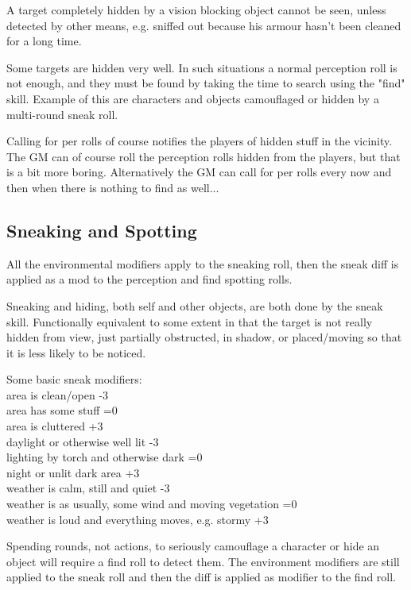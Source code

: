 A target completely hidden by a vision blocking object cannot be seen, unless detected by other means, e.g. sniffed out because his armour hasn't been cleaned for a long time.

Some targets are hidden very well. In such situations a normal perception roll is not enough, and they must be found by taking the time to search using the "find" skill. Example of this are characters and objects camouflaged or hidden by a multi-round sneak roll.

Calling for per rolls of course notifies the players of hidden stuff in the vicinity.
The GM can of course roll the perception rolls hidden from the players, but that is a bit more boring. Alternatively the GM can call for per rolls every now and then when there is nothing to find as well...


\subsection*{Sneaking and Spotting}
All the environmental modifiers apply to the sneaking roll, then the sneak diff is applied as a mod to the perception and find spotting rolls.

Sneaking and hiding, both self and other objects, are both done by the sneak skill. Functionally equivalent to some extent in that the target is not really hidden from view, just partially obstructed, in shadow, or placed/moving so that it is less likely to be noticed.

Some basic sneak modifiers:\\
area is clean/open -3\\
area has some stuff =0\\
area is cluttered +3\\
daylight or otherwise well lit -3\\
lighting by torch and otherwise dark =0\\
night or unlit dark area +3\\
weather is calm, still and quiet -3\\
weather is as usually, some wind and moving vegetation =0\\
weather is loud and everything moves, e.g. stormy  +3

Spending rounds, not actions, to seriously camouflage a character or hide an object will require a find roll to detect them. The environment modifiers are still applied to the sneak roll and then the diff is applied as modifier to the find roll.


